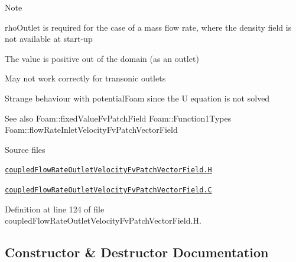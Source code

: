 \begin{DoxyNote}{Note}

\begin{DoxyItemize}
\item {\ttfamily rho\+Outlet} is required for the case of a mass flow rate, where the density field is not available at start-\/up
\item The value is positive out of the domain (as an outlet)
\item May not work correctly for transonic outlets
\item Strange behaviour with potential\+Foam since the U equation is not solved
\end{DoxyItemize}
\end{DoxyNote}
\begin{DoxySeeAlso}{See also}
Foam\+::fixed\+Value\+Fv\+Patch\+Field Foam\+::\+Function1\+Types Foam\+::flow\+Rate\+Inlet\+Velocity\+Fv\+Patch\+Vector\+Field
\end{DoxySeeAlso}
\begin{DoxyParagraph}{Source files}

\begin{DoxyItemize}
\item \href{../../../home/carlo/data/GeN-Foam/GeN-Foam_ffn/GeN-Foam/GeN-Foam/FMU4FOAM/ECI4FOAM/src/externalComm/externalIO/input/BC/coupledFlowRateOutletVelocity/coupledFlowRateOutletVelocityFvPatchVectorField.H}{\tt coupled\+Flow\+Rate\+Outlet\+Velocity\+Fv\+Patch\+Vector\+Field.\+H} 
\item \href{../../../home/carlo/data/GeN-Foam/GeN-Foam_ffn/GeN-Foam/GeN-Foam/FMU4FOAM/ECI4FOAM/src/externalComm/externalIO/input/BC/coupledFlowRateOutletVelocity/coupledFlowRateOutletVelocityFvPatchVectorField.C}{\tt coupled\+Flow\+Rate\+Outlet\+Velocity\+Fv\+Patch\+Vector\+Field.\+C} 
\end{DoxyItemize}
\end{DoxyParagraph}


Definition at line 124 of file coupled\+Flow\+Rate\+Outlet\+Velocity\+Fv\+Patch\+Vector\+Field.\+H.



\subsection{Constructor \& Destructor Documentation}
\mbox{\label{classFoam_1_1coupledFlowRateOutletVelocityFvPatchVectorField_a12a8467b944c58a5ea7386982681bb3d}} 
